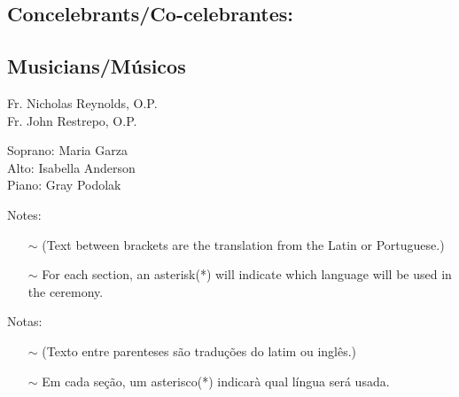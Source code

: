 \documentclass[10pt,a5]{article}
\newcommand \subsect[2] {\subsection*{#1} \switchcolumn \subsection*{#2} \switchcolumn*}
\newcommand{\sectionlinetwo}[2]{%
  \nointerlineskip \vspace{.5\baselineskip}\hspace{\fill}
  {\resizebox{0.75\linewidth}{1.2ex}
    {\pgfornament[color = #1]{#2}
    }}%
    \hspace{\fill}
    \par\nointerlineskip \vspace{.5\baselineskip}
  }
\begin{document}
\massenglish




\begin{paracol}{2}
	\subsect{Concelebrants/Co-celebrantes:}{Musicians/M\'usicos}

	\hspace*{2em}Fr. Nicholas Reynolds, O.P. \\
	\hspace*{2em}Fr. John Restrepo, O.P.

	\switchcolumn

	\hspace*{2em} Soprano: 	Maria Garza \\
	\hspace*{2em} Alto: 	Isabella Anderson \\
	\hspace*{2em} Piano: 	Gray Podolak\\

	\switchcolumn*

	Notes: 
	\begin{itemize}
		\item[$\sim$] (Text between brackets are the translation from the Latin or Portuguese.)
		\item[$\sim$] For each section, an asterisk(*) will indicate which language will be used in the ceremony.
	\end{itemize}

	\switchcolumn


	Notas: 
	\begin{itemize}
		\item[$\sim$] (Texto entre parenteses s\~ao tradu\c{c}\~oes do latim ou ingl\^es.) \\
		\item[$\sim$] Em cada se\c{c}\~ao, um asterisco(*) indicar\`a qual l\'ingua ser\'a usada.
	\end{itemize}

\end{paracol}
\sectionlinetwo{black}{89}
\end{document}
